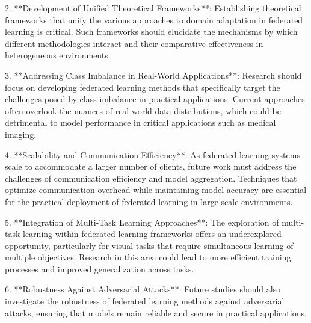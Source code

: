 \documentclass[journal]{IEEEtran}
\begin{document}
2. **Development of Unified Theoretical Frameworks**: Establishing theoretical frameworks that unify the various approaches to domain adaptation in federated learning is critical. Such frameworks should elucidate the mechanisms by which different methodologies interact and their comparative effectiveness in heterogeneous environments.

3. **Addressing Class Imbalance in Real-World Applications**: Research should focus on developing federated learning methods that specifically target the challenges posed by class imbalance in practical applications. Current approaches often overlook the nuances of real-world data distributions, which could be detrimental to model performance in critical applications such as medical imaging.

4. **Scalability and Communication Efficiency**: As federated learning systems scale to accommodate a larger number of clients, future work must address the challenges of communication efficiency and model aggregation. Techniques that optimize communication overhead while maintaining model accuracy are essential for the practical deployment of federated learning in large-scale environments.

5. **Integration of Multi-Task Learning Approaches**: The exploration of multi-task learning within federated learning frameworks offers an underexplored opportunity, particularly for visual tasks that require simultaneous learning of multiple objectives. Research in this area could lead to more efficient training processes and improved generalization across tasks.

6. **Robustness Against Adversarial Attacks**: Future studies should also investigate the robustness of federated learning methods against adversarial attacks, ensuring that models remain reliable and secure in practical applications.



\end{document}
